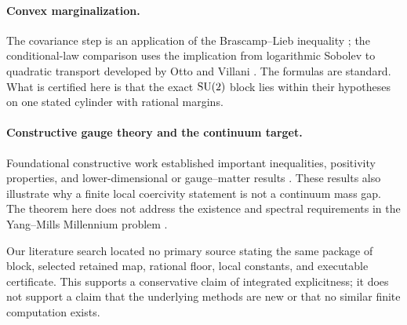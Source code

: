 \paragraph{Convex marginalization.}
The covariance step is an application of the Brascamp--Lieb inequality
\cite{BrascampLieb1976}; the conditional-law comparison uses the implication
from logarithmic Sobolev to quadratic transport developed by Otto and Villani
\cite{OttoVillani2000}.  The formulas are standard.  What is certified here is
that the exact $\mathrm{SU}(2)$ block lies within their hypotheses on one stated
cylinder with rational margins.

\paragraph{Constructive gauge theory and the continuum target.}
Foundational constructive work established important inequalities,
positivity properties, and lower-dimensional or gauge--matter results
\cite{BrydgesFrohlichSeiler1979}.  These results also illustrate why a finite
local coercivity statement is not a continuum mass gap.  The theorem here
does not address the existence and spectral requirements in the Yang--Mills
Millennium problem \cite{JaffeWitten2000}.

Our literature search located no primary source stating the same package of
block, selected retained map, rational floor, local constants, and executable
certificate.  This supports a conservative claim of integrated explicitness;
it does not support a claim that the underlying methods are new or that no
similar finite computation exists.
